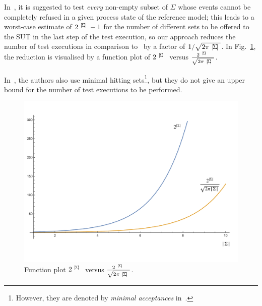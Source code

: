 In~\cite{Hennessy:1988:ATP:50497}, it is suggested to test 
{\it every} non-empty
subset of $\Sigma$ whose events cannot be completely refused in a given
process state of the reference model; this leads to a worst-case estimate of
$2^{{~|\! \Sigma\!|~}}-1$ for the number of different sets to be offered to the
SUT in the last step of the test execution, so our approach reduces the
number of test executions in comparison
to~\cite{Hennessy:1988:ATP:50497} by a factor
of $1/{\sqrt{2\pi {~|\! \Sigma\!|~}}}$. In Fig.~\ref{fig:minhita}, the reduction
is visualised by a function plot of $2^{{~|\! \Sigma\!|~}}$ versus
$\frac{2^{~|\! \Sigma\!|~}}{\sqrt{2\pi {~|\! \Sigma\!|~}}}$. 
 
In~\cite{DBLP:conf/icfem/CavalcantiG07}, the authors also use minimal hitting sets\footnote{However, they are denoted by {\it minimal acceptances} in~\cite{DBLP:conf/icfem/CavalcantiG07}.}, but they do not give an upper bound for
the number of test executions to be performed. 
 
 
 
 
 \begin{figure}
 \begin{center}
\includegraphics[width=.8\textwidth]{minhit-fig.pdf}
\end{center}
\vspace*{-10mm}
\caption{Function plot $2^{{~|\! \Sigma\!|~}}$ versus $\frac{2^{~|\! \Sigma\!|~}}{\sqrt{2\pi {~|\! \Sigma\!|~}}}$.}
 \label{fig:minhita}
 \end{figure}

